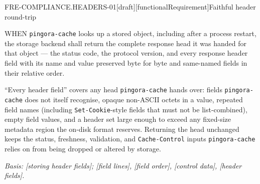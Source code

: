 %
%
\begin{requirement}{FRE-COMPLIANCE.HEADERS-01}[draft][functionalRequirement]{Faithful header round-trip}


  WHEN \texttt{pingora-cache} looks up a stored object, including after a
  process restart, the storage backend shall return the complete response
  head it was handed for that object --- the status code, the protocol
  version, and every response header field with its name and value
  preserved byte for byte and same-named fields in their relative order.

  ``Every header field'' covers any head \texttt{pingora-cache} hands over:
  fields \texttt{pingora-cache} does not itself recognise, opaque non-ASCII
  octets in a value, repeated field names (including
  \texttt{Set-Cookie}-style fields that must not be list-combined), empty
  field values, and a header set large enough to exceed any fixed-size
  metadata region the on-disk format reserves. Returning the head unchanged
  keeps the status, freshness, validation, and \texttt{Cache-Control} inputs
  \texttt{pingora-cache} relies on from being dropped or altered by storage.

  \textit{Basis: [storing header fields];
  [field lines], [field order],
  [control data], [header fields].}



\end{requirement}


